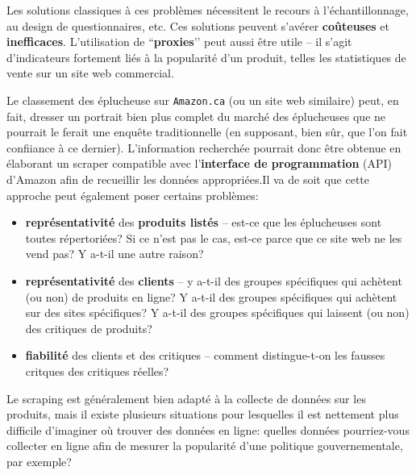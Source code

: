 Les solutions classiques à ces problèmes nécessitent le recours à l'échantillonnage, au design de questionnaires, %
etc. Ces solutions peuvent s’avérer  \textbf{coûteuses} et \textbf{inefficaces}. L’utilisation de ``\textbf{proxies}'’ peut aussi être utile -- il s’agit d'indicateurs fortement liés à la popularité d'un produit, telles les statistiques de vente sur un site web commercial. 
\par Le classement des éplucheuse sur \texttt{Amazon.ca} (ou un site web similaire) peut, en fait, dresser un portrait bien plus complet du marché des éplucheuses que ne pourrait le ferait une enquête traditionnelle (en supposant, bien sûr, que l’on fait confiiance à ce dernier). L’information recherchée pourrait donc être obtenue en élaborant un scraper compatible avec l'\textbf{interface de programmation} (API) d'Amazon afin de  recueillir les données appropriées.\newl Il va de soit que cette approche peut également poser certains problèmes: 
\begin{itemize}[noitemsep]
\item \textbf{représentativité} des \textbf{produits listés} -- est-ce que les éplucheuses sont toutes répertoriées? Si ce n'est pas le cas, est-ce parce que ce site web ne les vend pas? Y a-t-il une autre raison?
\item \textbf{représentativité} des \textbf{clients} -- y a-t-il des groupes spécifiques qui achètent (ou non) de produits en ligne? Y a-t-il des groupes spécifiques qui achètent sur des sites spécifiques? Y a-t-il des groupes spécifiques qui laissent (ou non) des critiques de produits? 
\item \textbf{fiabilité} des clients et des critiques -- comment dis\-tin\-gue-t-on les fausses critques des critiques réelles?
\end{itemize}
Le scraping est généralement bien adapté à la collecte de données sur les produits, mais il existe plusieurs situations pour lesquelles il est nettement plus difficile d'imaginer où trouver des données en ligne: quelles données pourriez-vous collecter en ligne afin de mesurer la popularité d'une politique gouvernementale, par exemple? 
